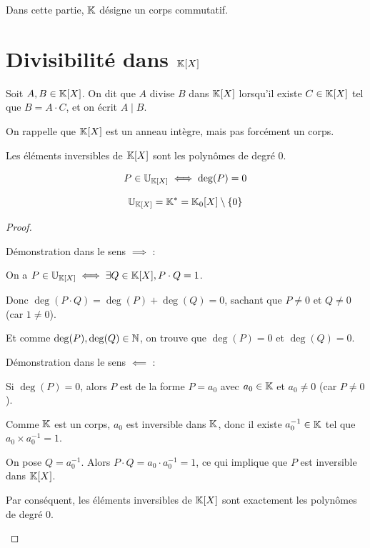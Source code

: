 \documentclass[12pt, a4paper]{report}
\begin{document}
\begin{importantbox}
    Dans cette partie, $\mathbb{K}$ désigne un corps commutatif.
\end{importantbox}

\section{Divisibilité dans $\mathbb{K}[X]$}

\begin{definition}[Rappel]
    Soit $A,B \in \mathbb{K}[X]$. On dit que $A$ divise $B$ dans $\mathbb{K}[X]$ lorsqu'il existe $C \in \mathbb{K}[X]$ tel que $B = A \cdot C$, et on écrit $A \mid B$.
\end{definition}

\begin{attention}
    On rappelle que $\mathbb{K}[X]$ est un anneau intègre, mais pas forcément un corps.
\end{attention}

\begin{property}
    Les éléments inversibles de $\mathbb{K}[X]$ sont les polynômes de degré 0.

    $$P \in \mathbb{U}_{\mathbb{K}[X]} \iff \deg(P) = 0$$

    $$\mathbb{U}_{\mathbb{K}[X]} = \mathbb{K}^* = \mathbb{K}_0[X]\setminus\{0\}$$
\end{property}

\begin{proof}
    \begin{outline}
        \1 Démonstration dans le sens $\implies$ :

        \2 On a $P \in \mathbb{U}_{\mathbb{K}[X]} \iff \exists Q \in \mathbb{K}[X], P\cdot Q = 1$.

        \2 Donc $\deg(P\cdot Q) = \deg(P) + \deg(Q) = 0$, sachant que $P \ne 0$ et $Q \ne 0$ (car $1 \ne 0$).

        \2 Et comme $\deg(P), \deg(Q) \in \mathbb{N}$, on trouve que $\deg(P) = 0$ et $\deg(Q) = 0$.

        \1 Démonstration dans le sens $\impliedby$ :

        \2 Si $\deg(P) = 0$, alors $P$ est de la forme $P = a_0$ avec $a_0 \in \mathbb{K}$ et $a_0 \ne 0$ (car $P \ne 0$).

        \2 Comme $\mathbb{K}$ est un corps, $a_0$ est inversible dans $\mathbb{K}$, donc il existe $a_0^{-1} \in \mathbb{K}$ tel que $a_0 \times a_0^{-1} = 1$.

        \2 On pose $Q = a_0^{-1}$. Alors $P\cdot Q = a_0 \cdot a_0^{-1} = 1$, ce qui implique que $P$ est inversible dans $\mathbb{K}[X]$.

        \1 Par conséquent, les éléments inversibles de $\mathbb{K}[X]$ sont exactement les polynômes de degré 0.
    \end{outline}

\end{proof}
\end{document}
